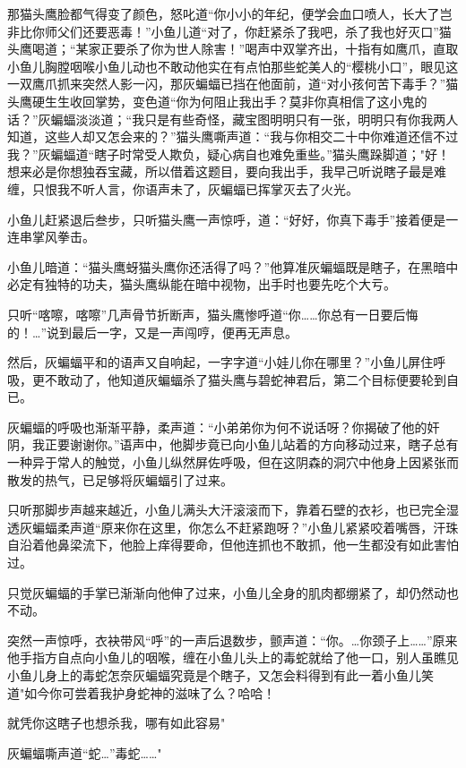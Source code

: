 \documentclass[12pt,oneside]{book}
\begin{document}
那猫头鹰脸都气得变了颜色，怒叱道``你小小的年纪，便学会血口喷人，长大了岂非比你师父们还要恶毒！''小鱼儿道``对了，你赶紧杀了我吧，杀了我也好灭口''猫头鹰喝道；``某家正要杀了你为世人除害！''喝声中双掌齐出，十指有如鹰爪，直取小鱼儿胸膛咽喉小鱼儿动也不敢动他实在有点怕那些蛇美人的``樱桃小口''，眼见这一双鹰爪抓来突然人影一闪，那灰蝙蝠已挡在他面前，道``对小孩何苦下毒手？''猫头鹰硬生生收回掌势，变色道``你为何阻止我出手？莫非你真相信了这小鬼的话？''灰蝙蝠淡淡道；``我只是有些奇怪，藏宝图明明只有一张，明明只有你我两人知道，这些人却又怎会来的？''猫头鹰嘶声道：``我与你相交二十中你难道还信不过我？''灰蝙蝠道``瞎子时常受人欺负，疑心病自也难免重些。''猫头鹰跺脚道；"好！想来必是你想独吞宝藏，所以借着这题目，要向我出手，我早己听说瞎子最是难缠，只恨我不听人言，你语声未了，灰蝙蝠已挥掌灭去了火光。

小鱼儿赶紧退后叁步，只听猫头鹰一声惊呼，道：``好好，你真下毒手''接着便是一连串掌风拳击。

小鱼儿暗道：``猫头鹰蚜猫头鹰你还活得了吗？''他算准灰蝙蝠既是瞎子，在黑暗中必定有独特的功夫，猫头鹰纵能在暗中视物，出手时也要先吃个大亏。

只听``喀嚓，喀嚓''几声骨节折断声，猫头鹰惨呼道``你\ldots\ldots 你总有一日要后悔的！\ldots{}''说到最后一字，又是一声闯哼，便再无声息。

然后，灰蝙蝠平和的语声又自响起，一字字道``小娃儿你在哪里？''小鱼儿屏住呼吸，更不敢动了，他知道灰蝙蝠杀了猫头鹰与碧蛇神君后，第二个目标便要轮到自已。

灰蝙蝠的呼吸也渐渐平静，柔声道：``小弟弟你为何不说话呀？你揭破了他的奸阴，我正要谢谢你。''语声中，他脚步竟已向小鱼儿站着的方向移动过来，瞎子总有一种异于常人的触觉，小鱼儿纵然屏佐呼吸，但在这阴森的洞穴中他身上因紧张而散发的热气，已足够将灰蝙蝠引了过来。

只听那脚步声越来越近，小鱼儿满头大汗滚滚而下，靠着石壁的衣衫，也已完全湿透灰蝙蝠柔声道``原来你在这里，你怎么不赶紧跑呀？''小鱼儿紧紧咬着嘴唇，汗珠自沿着他鼻梁流下，他脸上痒得要命，但他连抓也不敢抓，他一生都没有如此害怕过。

只觉灰蝙蝠的手掌已渐渐向他伸了过来，小鱼儿全身的肌肉都绷紧了，却仍然动也不动。

突然一声惊呼，衣袂带风``呼''的一声后退数步，颤声道：``你。\ldots 你颈子上\ldots\ldots{}''原来他手指方自点向小鱼儿的咽喉，缠在小鱼儿头上的毒蛇就给了他一口，别人虽瞧见小鱼儿身上的毒蛇怎奈灰蝙蝠究竟是个瞎子，又怎会料得到有此一着小鱼儿笑道"如今你可尝着我护身蛇神的滋味了么？哈哈！

就凭你这瞎子也想杀我，哪有如此容易"

灰蝙蝠嘶声道``蛇\ldots{}''毒蛇\ldots\ldots"
\end{document}
